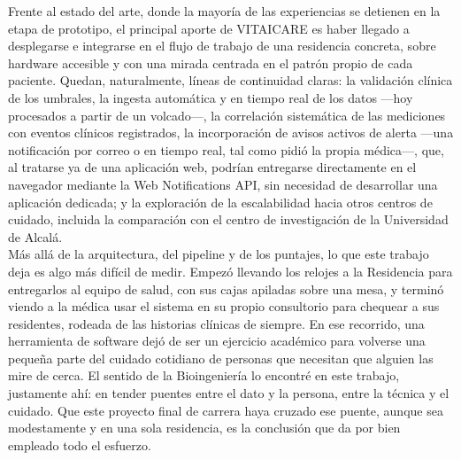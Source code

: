 Frente al estado del arte, donde la mayoría de las experiencias se detienen en la etapa de prototipo, el principal aporte de VITAICARE es haber llegado a desplegarse e integrarse en el flujo de trabajo de una residencia concreta, sobre hardware accesible y con una mirada centrada en el patrón propio de cada paciente. Quedan, naturalmente, líneas de continuidad claras: la validación clínica de los umbrales, la ingesta automática y en tiempo real de los datos —hoy procesados a partir de un volcado—, la correlación sistemática de las mediciones con eventos clínicos registrados, la incorporación de avisos activos de alerta —una notificación por correo o en tiempo real, tal como pidió la propia médica—, que, al tratarse ya de una aplicación web, podrían entregarse directamente en el navegador mediante la Web Notifications API, sin necesidad de desarrollar una aplicación dedicada; y la exploración de la escalabilidad hacia otros centros de cuidado, incluida la comparación con el centro de investigación de la Universidad de Alcalá.\\

Más allá de la arquitectura, del pipeline y de los puntajes, lo que este trabajo deja es algo más difícil de medir. Empezó llevando los relojes a la Residencia para entregarlos al equipo de salud, con sus cajas apiladas sobre una mesa, y terminó viendo a la médica usar el sistema en su propio consultorio para chequear a sus residentes, rodeada de las historias clínicas de siempre. En ese recorrido, una herramienta de software dejó de ser un ejercicio académico para volverse una pequeña parte del cuidado cotidiano de personas que necesitan que alguien las mire de cerca. El sentido de la Bioingeniería lo encontré en este trabajo, justamente ahí: en tender puentes entre el dato y la persona, entre la técnica y el cuidado. Que este proyecto final de carrera haya cruzado ese puente, aunque sea modestamente y en una sola residencia, es la conclusión que da por bien empleado todo el esfuerzo.\\


